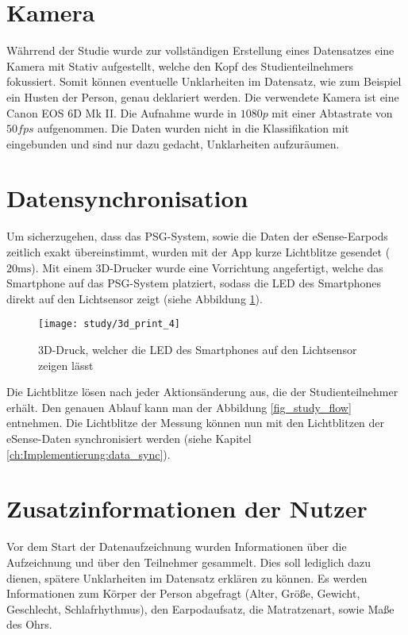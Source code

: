 \section{Kamera}
\label{ch:sa:camera}
Währrend der Studie wurde zur vollständigen Erstellung eines Datensatzes eine Kamera mit Stativ aufgestellt, welche den Kopf des Studienteilnehmers fokussiert. 
Somit können eventuelle Unklarheiten im Datensatz, wie zum Beispiel ein Husten der Person, genau deklariert werden. 
Die verwendete Kamera ist eine \glqq Canon EOS 6D Mk II\grqq.
Die Aufnahme wurde in $1080p$ mit einer Abtastrate von $50fps$ aufgenommen.
Die Daten wurden nicht in die Klassifikation mit eingebunden und sind nur dazu gedacht, Unklarheiten aufzuräumen.

\section{Datensynchronisation}
\label{ch:sa:data_synchronisation}
Um sicherzugehen, dass das PSG-System, sowie die Daten der eSense-Earpods zeitlich exakt übereinstimmt, wurden mit der App kurze Lichtblitze gesendet ($20 \si{\ms}$).
Mit einem 3D-Drucker wurde eine Vorrichtung angefertigt, welche das Smartphone auf das PSG-System platziert, sodass die LED des Smartphones direkt auf den Lichtsensor zeigt (siehe Abbildung \ref{study:3d_print}).

\begin{figure}[ht]
    \centering
    \texttt{[image: study/3d\_print\_4]}
    \caption{3D-Druck, welcher die LED des Smartphones auf den Lichtsensor zeigen lässt}
    \label{study:3d_print}
  \end{figure}

Die Lichtblitze lösen nach jeder Aktionsänderung aus, die der Studienteilnehmer erhält. 
Den genauen Ablauf kann man der Abbildung \ref{fig_study_flow} entnehmen.
Die Lichtblitze der Messung können nun mit den Lichtblitzen der eSense-Daten synchronisiert werden (siehe Kapitel \ref{ch:Implementierung:data_sync}).

\section{Zusatzinformationen der Nutzer}
\label{ch:sa:additionalUserStudiesInformation}
Vor dem Start der Datenaufzeichnung wurden Informationen über die Aufzeichnung und über den Teilnehmer gesammelt. 
Dies soll lediglich dazu dienen, spätere Unklarheiten im Datensatz erklären zu können.
Es werden Informationen zum Körper der Person abgefragt (Alter, Größe, Gewicht, Geschlecht, Schlafrhythmus), den Earpodaufsatz, die Matratzenart, sowie Maße des Ohrs.

